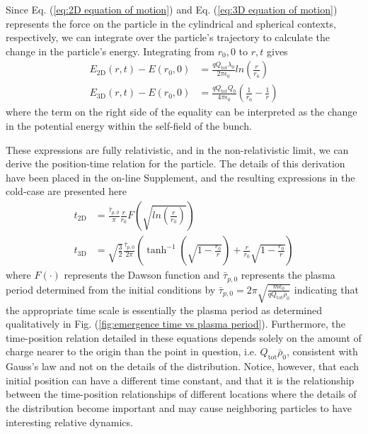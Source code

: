 \documentclass[aps,prl,twocolumn,showpacs,superscriptaddress,groupedaddress]{revtex4-1}  %
\begin{document}
{ Since Eq. (\ref{eq:2D equation of motion}) and Eq. (\ref{eq:3D equation of motion}) 
 represents the force on the particle in the cylindrical and spherical contexts, respectively, 
 we can integrate over the particle's 
 trajectory to calculate the change in the particle's energy. 
 Integrating from $r_0, 0$ to $r, t$ gives
\begin{align}
  E_\text{2D}(r,t) - E(r_0,0) &= \frac{q Q_\text{tot} \lambda_0}{2 \pi \epsilon_0} ln\left(\frac{r}{r_0}\right)\label{eq:2D energy}\\
  E_\text{3D}(r,t) - E(r_0,0) &= \frac{q Q_\text{tot} Q_0}{4 \pi \epsilon_0} \left(\frac{1}{r_0} - \frac{1}{r}\right)\label{eq:3D energy}
\end{align}
where the term on the right side of the equality can be interpreted as  the change in the potential energy within the self-field
of the bunch.  

These expressions are fully relativistic, and in the non-relativistic limit, we can derive the position-time relation for the particle.
The details of this derivation have been placed in the on-line Supplement, and the resulting expressions in the cold-case are presented here
\begin{align}
  t_\text{2D} &= \frac{\bar{\tau}_{p,0}}{\pi} \frac{r}{r_0} F\left(\sqrt{ln\left(\frac{r}{r_0}\right)}\right)\label{eq:2D time}\\
  t_\text{3D} &= \sqrt{\frac{3}{2}}\frac{\bar{\tau}_{p,0}}{2\pi} \left( \tanh^{-1} \left( \sqrt{1 -  \frac{r_0}{r}} \right) + \frac{r}{r_0}\sqrt{1 -  \frac{r_0}{r}}\right)\label{eq:3D time}
\end{align}
where $F(\cdot)$ represents the Dawson function and $\bar{\tau}_{p,0}$ represents the plasma period 
determined from the initial conditions
by $\bar{\tau}_{p,0} = 2\pi \sqrt{\frac{m\epsilon_0}{q Q_\text{tot} \bar{\rho}_0}}$ indicating that the
appropriate time scale is essentially the plasma period as determined qualitatively in Fig. (\ref{fig:emergence time vs plasma period}).
Furthermore, the time-position relation detailed in these equations depends solely on the amount of charge 
nearer to the origin than the point in question, i.e. $Q_\text{tot} \bar{\rho}_0$, consistent with 
Gauss's law and not on the details of the distribution.  Notice, however,
that each initial position can have a different time constant, and that it is the relationship between the 
time-position relationships of different locations where the details of the distribution become important and may cause
neighboring particles to have interesting relative dynamics.  

}
\end{document}
